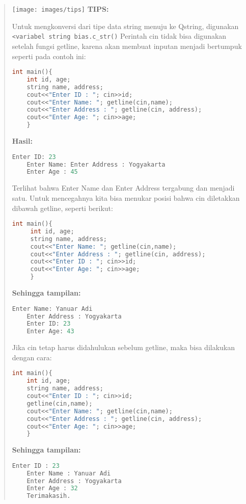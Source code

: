 \begin{quotation}

\texttt{[image: images/tips]}	\textbf{TIPS:} 
	
	Untuk
	mengkonversi dari tipe data string menuju ke Qstring, digunakan
	\texttt{\textless{}variabel\ string\ bias.c\_str()} Perintah cin tidak
	bisa digunakan setelah fungsi getline, karena akan membuat inputan
	menjadi bertumpuk seperti pada contoh ini:
	
	\begin{lstlisting}[language=c++, numbers=none]
	int main(){
	int id, age;
	string name, address;
	cout<<"Enter ID : "; cin>>id;
	cout<<"Enter Name: "; getline(cin,name);
	cout<<"Enter Address : "; getline(cin, address);
	cout<<"Enter Age: "; cin>>age;
	}
	\end{lstlisting}
	
	\textbf{Hasil:}
	
	\begin{lstlisting}[language=c++, numbers=none]
	Enter ID: 23
	Enter Name: Enter Address : Yogyakarta
	Enter Age : 45
	\end{lstlisting}
	
	Terlihat bahwa Enter Name dan Enter Address tergabung dan menjadi satu.
	Untuk mencegahnya kita bisa menukar posisi bahwa cin diletakkan dibawah
	getline, seperti berikut:
	
	\begin{lstlisting}[language=c++, numbers=none]
	int main(){
	 int id, age;
	 string name, address;
	 cout<<"Enter Name: "; getline(cin,name);
	 cout<<"Enter Address : "; getline(cin, address);
	 cout<<"Enter ID : "; cin>>id;
	 cout<<"Enter Age: "; cin>>age;
	 }
	\end{lstlisting}
	
	\textbf{Sehingga tampilan:}
	
	\begin{lstlisting}[language=c++, numbers=none]
	Enter Name: Yanuar Adi
	Enter Address : Yogyakarta
	Enter ID: 23
	Enter Age: 43
	\end{lstlisting}
	
	Jika cin tetap harus didahulukan sebelum getline, maka bisa dilakukan
	dengan cara:
	
	\begin{lstlisting}[language=c++, numbers=none]
	int main(){
	int id, age;
	string name, address;
	cout<<"Enter ID : "; cin>>id;
	getline(cin,name);
	cout<<"Enter Name: "; getline(cin,name);
	cout<<"Enter Address : "; getline(cin, address);
	cout<<"Enter Age: "; cin>>age;
	}
	\end{lstlisting}
	
	\textbf{Sehingga tampilan:}
	
	\begin{lstlisting}[language=c++, numbers=none]
	Enter ID : 23
	Enter Name : Yanuar Adi
	Enter Address : Yogyakarta
	Enter Age : 32
	Terimakasih.
	\end{lstlisting}
\end{quotation}

